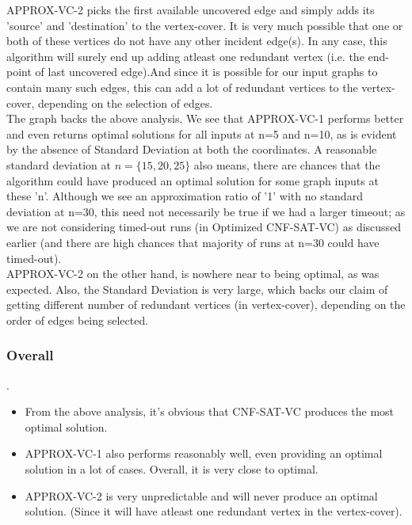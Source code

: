 \documentclass[11pt]{llncs}
\begin{document}
		APPROX-VC-2 picks the first available uncovered edge and simply adds its 'source' and 'destination' to the vertex-cover. It is very much possible that one or both of these vertices do not have any other incident edge(s). In any case, this algorithm will surely end up adding atleast one redundant vertex (i.e. the end-point of last uncovered edge).And since it is possible for our input graphs to contain many such edges, this can add a lot of redundant vertices to the vertex-cover, depending on the selection of edges.\\

		The graph backs the above analysis. We see that APPROX-VC-1 performs better and even returns optimal solutions for all inputs at n=5 and n=10, as is evident by the absence of Standard Deviation at both the coordinates. A reasonable standard deviation at $n= \{15, 20, 25\}$ also means, there are chances that the algorithm could have produced an optimal solution for some graph inputs at these 'n'. Although we see an approximation ratio of '1' with no standard deviation at n=30, this need not necessarily be true if we had a larger timeout; as we are not considering timed-out  runs (in Optimized CNF-SAT-VC) as discussed earlier (and there are high chances that majority of runs at n=30 could have timed-out).\\

		APPROX-VC-2 on the other hand, is nowhere near to being optimal, as was expected. Also, the Standard Deviation is very large, which backs our claim of getting different number of redundant vertices (in vertex-cover), depending on the order of edges being selected.


	\subsubsection{Overall}.
		\begin{itemize}
			\item From the above analysis, it's obvious that CNF-SAT-VC  produces the most optimal solution.
			\item APPROX-VC-1 also performs reasonably well, even providing an optimal solution in a lot of cases. Overall, it is very close to optimal.
			\item APPROX-VC-2 is very unpredictable and will never produce an optimal solution. (Since it will have atleast one redundant vertex in the vertex-cover).\\
		\end{itemize}
\end{document}
